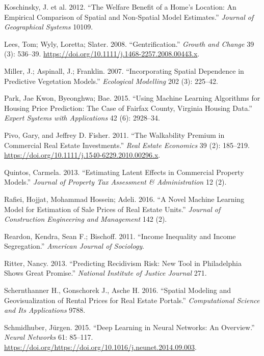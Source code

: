 \documentclass[12pt,]{article}
\begin{document}
\leavevmode\hypertarget{ref-Koschinsky2012}{}%
Koschinsky, J. et al. 2012. ``The Welfare Benefit of a Home's Location:
An Empirical Comparison of Spatial and Non-Spatial Model Estimates.''
\emph{Journal of Geographical Systems} 10109.

\leavevmode\hypertarget{ref-Lees2008}{}%
Lees, Tom; Wyly, Loretta; Slater. 2008. ``Gentrification.'' \emph{Growth
and Change} 39 (3): 536--39.
\url{https://doi.org/10.1111/j.1468-2257.2008.00443.x}.

\leavevmode\hypertarget{ref-Miller2015}{}%
Miller, J.; Aspinall, J.; Franklin. 2007. ``Incorporating Spatial
Dependence in Predictive Vegetation Models.'' \emph{Ecological
Modelling} 202 (3): 225--42.

\leavevmode\hypertarget{ref-Park2015}{}%
Park, Jae Kwon, Byeonghwa; Bae. 2015. ``Using Machine Learning
Algorithms for Housing Price Prediction: The Case of Fairfax County,
Virginia Housing Data.'' \emph{Expert Systems with Applications} 42 (6):
2928--34.

\leavevmode\hypertarget{ref-Pivo2011}{}%
Pivo, Gary, and Jeffrey D. Fisher. 2011. ``The Walkability Premium in
Commercial Real Estate Investments.'' \emph{Real Estate Economics} 39
(2): 185--219. \url{https://doi.org/10.1111/j.1540-6229.2010.00296.x}.

\leavevmode\hypertarget{ref-Quintos2013}{}%
Quintos, Carmela. 2013. ``Estimating Latent Effects in Commercial
Property Models.'' \emph{Journal of Property Tax Assessment \&
Administration} 12 (2).

\leavevmode\hypertarget{ref-Rafiei2016}{}%
Rafiei, Hojjat, Mohammad Hossein; Adeli. 2016. ``A Novel Machine
Learning Model for Estimation of Sale Prices of Real Estate Units.''
\emph{Journal of Construction Engineering and Management} 142 (2).

\leavevmode\hypertarget{ref-Reardon2011}{}%
Reardon, Kendra, Sean F.; Bischoff. 2011. ``Income Inequality and Income
Segregation.'' \emph{American Journal of Sociology}.

\leavevmode\hypertarget{ref-Ritter2013}{}%
Ritter, Nancy. 2013. ``Predicting Recidivism Risk: New Tool in
Philadelphia Shows Great Promise.'' \emph{National Institute of Justice
Journal} 271.

\leavevmode\hypertarget{ref-Schernthanner2016}{}%
Schernthanner H., Gonschorek J., Asche H. 2016. ``Spatial Modeling and
Geovisualization of Rental Prices for Real Estate Portals.''
\emph{Computational Science and Its Applications} 9788.

\leavevmode\hypertarget{ref-SCHMIDHUBER201585}{}%
Schmidhuber, Jürgen. 2015. ``Deep Learning in Neural Networks: An
Overview.'' \emph{Neural Networks} 61: 85--117.
\url{https://doi.org/https://doi.org/10.1016/j.neunet.2014.09.003}.
\end{document}

